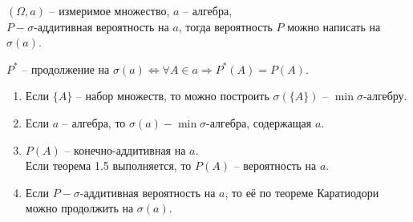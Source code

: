 \begin{theorem}[Каратиодори]
  $(\Omega, a)$ -- измеримое множество, $a$ -- алгебра,\\
  $P - \sigma$-аддитивная вероятность на $a$, тогда вероятность $P$ можно написать на $\sigma(a)$.
\end{theorem}

$P^*$ -- продолжение на $\sigma (a) \Leftrightarrow \forall A \in a \Rightarrow P^*(A) = P(A)$.

\begin{enumerate}
  \item Если $\{A\}$ -- набор множеств, то можно построить $\sigma (\{A\})$ -- $\min \sigma$-алгебру.
  \item Если $a$ -- алгебра, то $\sigma(a) - \min \sigma$-алгебра, содержащая $a$.
  \item $P(A)$ -- конечно-аддитивная на $a$.\\
    Если теорема 1.5 выполняется, то $P(A)$ -- вероятность на $a$.
  \item Если $P - \sigma$-аддитивная вероятность на $a$, то её по теореме Каратиодори можно продолжить на $\sigma(a)$.
\end{enumerate}
